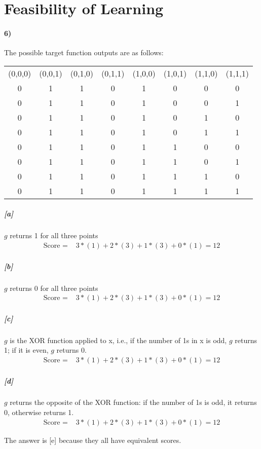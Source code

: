 \documentclass[10pt,letter]{article}
\begin{document}
\section*{Feasibility of Learning}

\paragraph{6)} The possible target function outputs are as follows:
	
	\begin{tabular}{||c|c|c|c|c|c|c|c||}
	  (0,0,0) & (0,0,1) & (0,1,0) & (0,1,1) & (1,0,0) & (1,0,1) & (1,1,0) & (1,1,1) \\
	  0&1&1&0&1& 0&0&0 \\
	  0&1&1&0&1& 0&0&1 \\
	  0&1&1&0&1& 0&1&0 \\
	  0&1&1&0&1& 0&1&1 \\
	  0&1&1&0&1& 1&0&0 \\
	  0&1&1&0&1& 1&0&1 \\
	  0&1&1&0&1& 1&1&0 \\
	  0&1&1&0&1& 1&1&1 \\
	\end{tabular}

\subparagraph{[a]} $g$ returns 1 for all three points
	\begin{align*}
	\text{Score = }& 3 * (1) + 2 * (3) + 1 * (3) + 0 * (1) = 12
	\end{align*}
\subparagraph{[b]} $g$ returns 0 for all three points
	\begin{align*}
	\text{Score = }& 3 * (1) + 2 * (3) + 1 * (3) + 0 * (1) = 12
	\end{align*}
\subparagraph{[c]} $g$ is the XOR function applied to x, i.e., if the number of 1s in x is odd, $g$ returns 1; if it is even, $g$ returns 0.
	\begin{align*}
	\text{Score = }& 3 * (1) + 2 * (3) + 1 * (3) + 0 * (1) = 12
	\end{align*}
\subparagraph{[d]} $g$ returns the opposite of the XOR function: if the number of 1s is odd, it returns 0, otherwise returns 1.
	\begin{align*}
	\text{Score = }& 3 * (1) + 2 * (3) + 1 * (3) + 0 * (1) = 12
	\end{align*}

The answer is [e] because they all have equivalent scores.

\end{document}
